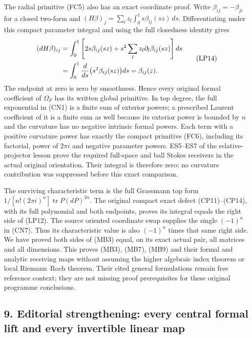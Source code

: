 \documentclass[
  11pt,
]{article}
\begin{document}
The radial primitive (FC5) also has an exact coordinate proof. Write
\(\beta_{ij}=-\beta_{ji}\) for a closed two-form and
\((H\beta)_j=\sum_l z_l\int_0^1s\beta_{lj}(sz)\,ds\). Differentiating
under this compact parameter integral and using the full closedness
identity gives \[
 \begin{aligned}
 (dH\beta)_{ij}
 &=\int_0^1\left[2s\beta_{ij}(sz)
       +s^2\sum_lz_l\partial_l\beta_{ij}(sz)\right]ds\\
 &=\int_0^1{d\over ds}\bigl(s^2\beta_{ij}(sz)\bigr)ds
   =\beta_{ij}(z).
 \end{aligned}
 \tag{LP14}
\] The endpoint at zero is zero by smoothness. Hence every original
formal coefficient of \(\Omega_F\) has its written global primitive. In
top degree, the full exponential in (CN1) is a finite sum of exterior
powers; a prescribed Laurent coefficient of it is a finite sum as well
because its exterior power is bounded by \(n\) and the curvature has no
negative intrinsic formal powers. Each term with a positive curvature
power has exactly the compact primitive (FC6), including its factorial,
power of \(2\pi i\) and negative parameter powers. ES5--ES7 of the
relative-projector lesson prove the required full-space and ball Stokes
receivers in the actual original orientation. Their integral is
therefore zero; no curvature contribution was suppressed before this
exact comparison.

The surviving characteristic term is the full Grassmann top form
\(1/[n!(2\pi i)^n]\operatorname{tr}P(dP)^{2n}\). The original compact
exact defect (CP11)--(CP14), with its full polynomial and both
endpoints, proves its integral equals the right side of (LP12). The
source oriented coordinate swap supplies the single \((-1)^n\) in (CN7).
Thus its characteristic value is also \((-1)^n\) times that same right
side. We have proved both sides of (MB3) equal, on its exact actual
pair, all matrices and all dimensions. This proves (MB3), (MB7), (MB9)
and their formal and analytic receiving maps without assuming the higher
algebraic index theorem or local Riemann--Roch theorem. Their cited
general formulations remain free reference context; they are not missing
proof prerequisites for these original programme conclusions.

\subsection{9. Editorial strengthening: every central formal lift and
every invertible linear
map}\label{editorial-strengthening-every-central-formal-lift-and-every-invertible-linear-map}
\end{document}
